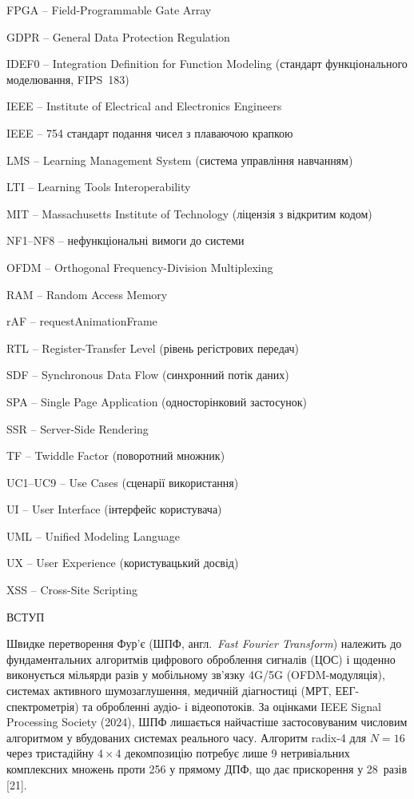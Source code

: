 \documentclass[
]{article}
\begin{document}
FPGA -- Field-Programmable Gate Array

GDPR -- General Data Protection Regulation

IDEF0 -- Integration Definition for Function Modeling (стандарт
функціонального моделювання, FIPS~183)

IEEE -- Institute of Electrical and Electronics Engineers

IEEE -- 754 стандарт подання чисел з плаваючою крапкою

LMS -- Learning Management System (система управління навчанням)

LTI -- Learning Tools Interoperability

MIT -- Massachusetts Institute of Technology (ліцензія з відкритим
кодом)

NF1--NF8 -- нефункціональні вимоги до системи

OFDM -- Orthogonal Frequency-Division Multiplexing

RAM -- Random Access Memory

rAF -- requestAnimationFrame

RTL -- Register-Transfer Level (рівень регістрових передач)

SDF -- Synchronous Data Flow (синхронний потік даних)

SPA -- Single Page Application (односторінковий застосунок)

SSR -- Server-Side Rendering

TF -- Twiddle Factor (поворотний множник)

UC1--UC9 -- Use Cases (сценарії використання)

UI -- User Interface (інтерфейс користувача)

UML -- Unified Modeling Language

UX -- User Experience (користувацький досвід)

XSS -- Cross-Site Scripting

\textbf{\hfill\break
}

\protect{}\label{_Toc230379706}{}ВСТУП

Швидке перетворення Фур'є (ШПФ, англ.~\emph{Fast Fourier Transform})
належить до фундаментальних алгоритмів цифрового оброблення сигналів
(ЦОС) і щоденно виконується мільярди разів у мобільному зв'язку 4G/5G
(OFDM-модуляція), системах активного шумозаглушення, медичній
діагностиці (МРТ, ЕЕГ-спектрометрія) та обробленні аудіо- і
відеопотоків. За оцінками IEEE Signal Processing Society (2024), ШПФ
лишається найчастіше застосовуваним числовим алгоритмом у вбудованих
системах реального часу. Алгоритм radix-4 для \(N = 16\) через
тристадійну \(4 \times 4\) декомпозицію потребує лише 9 нетривіальних
комплексних множень проти 256 у прямому ДПФ, що дає прискорення у
28~разів {[}21{]}.
\end{document}
